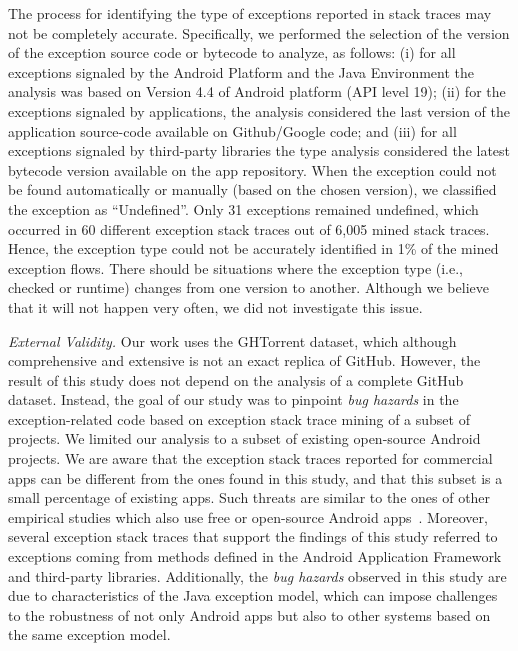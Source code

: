 {The process for
identifying the type of exceptions reported in stack traces may not be completely
accurate.
Specifically, we performed the selection of the version of the exception source code or bytecode
to analyze, as follows: (i) for all exceptions signaled by the Android Platform
and the Java Environment the analysis was based on Version 4.4 of Android platform (API level 19);  (ii)
for the exceptions signaled by applications, the analysis considered
the last version of the application source-code available on Github/Google code; and (iii)
for all exceptions signaled by third-party libraries the type analysis
considered the latest bytecode version available on the app repository.
When the exception could not be found automatically or manually (based on the chosen version),
we classified the exception as ``Undefined''.  Only 31 exceptions
remained undefined, which occurred in 60 different exception stack traces out of 6,005 mined stack traces.
Hence, the exception type could not be accurately identified in 1\% of the mined
exception flows.
There should be situations where the exception type (i.e., checked or runtime) changes from one version to another.
Although we believe that it will not happen very often, we did not investigate
this issue.


\emph{External Validity.} Our work uses the GHTorrent dataset, which although
comprehensive and extensive is not an exact replica of GitHub.
However, the result of this study does not depend on the analysis of
a complete GitHub dataset. Instead, the goal of our study was to
pinpoint \emph{bug hazards} in the exception-related code based on
exception stack trace mining of a subset of projects.
We limited our analysis to a subset of existing open-source Android projects.
We are aware that the exception stack traces reported
for commercial apps can be different from the ones found in this study, and that
this subset is a small percentage of existing apps.
Such threats are similar to the ones of other empirical studies
which also use free or open-source Android apps~\cite{Linar13,McDon13,Ruiz12}.
Moreover, several exception stack traces that support the findings of this study
referred to exceptions coming from methods defined in the Android Application Framework
and third-party libraries.  Additionally,  the \emph{bug hazards} observed in this study are due to
characteristics of the Java exception model, which can impose challenges to
the robustness of not only Android apps but also to other systems
 based on the same exception model.

}
